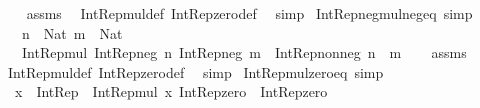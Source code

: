 \begin{isabellebody}
%
\isadelimproof
\ \ %
\endisadelimproof
%
\isatagproof
{}\isamarkupfalse%
\ assms\ \isamarkupfalse%
\ Int{\isacharunderscore}{\kern0pt}Rep{\isacharunderscore}{\kern0pt}mul{\isacharunderscore}{\kern0pt}def\ Int{\isacharunderscore}{\kern0pt}Rep{\isacharunderscore}{\kern0pt}zero{\isacharunderscore}{\kern0pt}def\ \isamarkupfalse%
\ simp%
\endisatagproof
{\isafoldproof}%
%
\isadelimproof
\isanewline
%
\endisadelimproof
\isanewline
{}\isamarkupfalse%
\ Int{\isacharunderscore}{\kern0pt}Rep{\isacharunderscore}{\kern0pt}neg{\isacharunderscore}{\kern0pt}mul{\isacharunderscore}{\kern0pt}neg{\isacharunderscore}{\kern0pt}eq\ {\isacharbrackleft}{\kern0pt}simp{\isacharbrackright}{\kern0pt}{\isacharcolon}{\kern0pt}\isanewline
\ \ \ {\isachardoublequoteopen}n\ {\isacharcolon}{\kern0pt}\ Nat{\isachardoublequoteclose}\ {\isachardoublequoteopen}m\ {\isacharcolon}{\kern0pt}\ Nat{\isachardoublequoteclose}\isanewline
\ \ \ {\isachardoublequoteopen}Int{\isacharunderscore}{\kern0pt}Rep{\isacharunderscore}{\kern0pt}mul\ {\isacharparenleft}{\kern0pt}Int{\isacharunderscore}{\kern0pt}Rep{\isacharunderscore}{\kern0pt}neg\ n{\isacharparenright}{\kern0pt}\ {\isacharparenleft}{\kern0pt}Int{\isacharunderscore}{\kern0pt}Rep{\isacharunderscore}{\kern0pt}neg\ m{\isacharparenright}{\kern0pt}\ {\isacharequal}{\kern0pt}\ Int{\isacharunderscore}{\kern0pt}Rep{\isacharunderscore}{\kern0pt}nonneg\ {\isacharparenleft}{\kern0pt}n\ {\isacharasterisk}{\kern0pt}\ m{\isacharparenright}{\kern0pt}{\isachardoublequoteclose}\isanewline
%
\isadelimproof
\ \ %
\endisadelimproof
%
\isatagproof
{}\isamarkupfalse%
\ assms\ \isamarkupfalse%
\ Int{\isacharunderscore}{\kern0pt}Rep{\isacharunderscore}{\kern0pt}mul{\isacharunderscore}{\kern0pt}def\ Int{\isacharunderscore}{\kern0pt}Rep{\isacharunderscore}{\kern0pt}zero{\isacharunderscore}{\kern0pt}def\ \isamarkupfalse%
\ simp%
\endisatagproof
{\isafoldproof}%
%
\isadelimproof
\isanewline
%
\endisadelimproof
\isanewline
{}\isamarkupfalse%
\ Int{\isacharunderscore}{\kern0pt}Rep{\isacharunderscore}{\kern0pt}mul{\isacharunderscore}{\kern0pt}zero{\isacharunderscore}{\kern0pt}eq\ {\isacharbrackleft}{\kern0pt}simp{\isacharbrackright}{\kern0pt}{\isacharcolon}{\kern0pt}\isanewline
\ \ {\isachardoublequoteopen}x\ {\isacharcolon}{\kern0pt}\ Int{\isacharunderscore}{\kern0pt}Rep\ {\isasymLongrightarrow}\ Int{\isacharunderscore}{\kern0pt}Rep{\isacharunderscore}{\kern0pt}mul\ x\ Int{\isacharunderscore}{\kern0pt}Rep{\isacharunderscore}{\kern0pt}zero\ {\isacharequal}{\kern0pt}\ Int{\isacharunderscore}{\kern0pt}Rep{\isacharunderscore}{\kern0pt}zero{\isachardoublequoteclose}\isanewline

\end{isabellebody}
